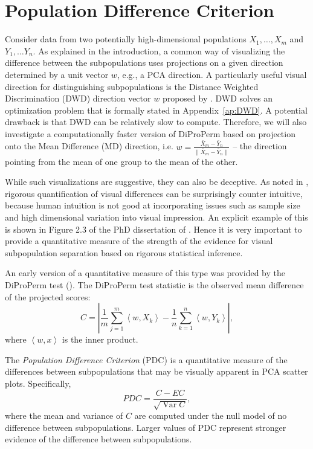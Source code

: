 \documentclass[12pt]{article}
\begin{document}
{
\section{Population Difference Criterion}
\label{pdc-define}
Consider data from two potentially high-dimensional populations $X_1,\ldots,X_m$ and $Y_1,\ldots Y_n$. As explained in the introduction, a common way of visualizing the difference between the subpopulations uses projections on a given direction determined by a unit vector $w$, e.g., a PCA direction.
A particularly useful visual direction for distinguishing subpopulations is the Distance Weighted Discrimination (DWD)
direction vector $w$ proposed by \citet{marron2007distance}. 
{DWD solves an optimization problem that is formally stated in Appendix~\ref{ap:DWD}}. A potential drawback is that DWD can be relatively slow to compute. Therefore, we will also investigate a computationally faster version of DiProPerm based on projection onto the Mean Difference (MD) direction, i.e. $w=\frac{\bar X_m-\bar Y_n}{\|\bar X_m-\bar Y_n\|}$ -- the direction pointing from the mean of one group to the mean of the other.

While such visualizations are suggestive, they can also be deceptive.  As noted in \citet{wei2016direction}, rigorous quantification of visual differences can be surprisingly counter intuitive, because human intuition is not good at incorporating issues such as sample size and high dimensional variation into visual impression.
 An explicit example of this is shown in Figure 2.3 of the PhD dissertation of \cite{yang2021machine}. Hence it is very important to provide a quantitative measure of the strength of the evidence for visual subpopulation separation  based on rigorous statistical inference.

An early version of a quantitative measure  of 
this type was provided by the DiProPerm test (\citet{wei2016direction}).
The DiProPerm test statistic is the observed mean difference of the projected scores:
\begin{equation}\label{eq:Cdef}
C = \left|\frac 1m\sum_{j=1}^m \left<w, X_k\right> - \frac 1n\sum_{k=1}^n \left<w,Y_k\right>\right|,
\end{equation}
where $\left<w,x\right>$ is the inner product.

The \emph{Population Difference Criterion} (PDC) is a quantitative measure of the differences between subpopulations that may be visually apparent in PCA scatter plots. Specifically, 
\[%
PDC=\frac{C-E{C}}{\sqrt{\operatorname{Var} C}},
\]%
where the mean and variance of $C$ are computed under the null model of no difference between subpopulations.
Larger values of PDC represent stronger evidence of the difference between subpopulations. 

}
\end{document}
